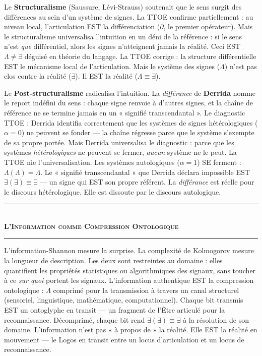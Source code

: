 \documentclass[10pt, openany, oneside]{book}
\renewcommand{\normalsize}{\fontsize{10}{13}\selectfont}
\begin{document}
Le \textbf{Structuralisme} (Saussure, Lévi-Strauss) soutenait que le sens surgit des différences au sein d'un système de signes. La TTOE confirme partiellement : au niveau local, l'articulation EST la différenciation ($\partial$, le premier opérateur). Mais le structuralisme universalisa l'intuition en un déni de la référence : si le sens n'est \textit{que} différentiel, alors les signes n'atteignent jamais la réalité. Ceci EST $\Lambda \neq \exists$ déguisé en théorie du langage. La TTOE corrige : la structure différentielle EST le mécanisme local de l'articulation. Mais le système des signes ($\Lambda$) n'est pas clos contre la réalité ($\exists$). Il EST la réalité ($\Lambda \equiv \exists$).

Le \textbf{Post-structuralisme} radicalisa l'intuition. La \textit{différance} de \textbf{Derrida} nomme le report indéfini du sens : chaque signe renvoie à d'autres signes, et la chaîne de référence ne se termine jamais en un « signifié transcendantal ». Le diagnostic TTOE : Derrida identifia correctement que les systèmes de signes hétérologiques ($\alpha = 0$) ne peuvent se fonder --- la chaîne régresse parce que le système s'exempte de sa propre portée. Mais Derrida universalisa le diagnostic : parce que les systèmes \textit{hétérologiques} ne peuvent se fermer, \textit{aucun} système ne le peut. La TTOE nie l'universalisation. Les systèmes autologiques ($\alpha = 1$) SE ferment : $\Lambda(\Lambda) = \Lambda$. Le « signifié transcendantal » que Derrida déclara impossible EST $\exists(\exists) \equiv \exists$ --- un signe qui EST son propre référent. La \textit{différance} est réelle pour le discours hétérologique. Elle est dissoute par le discours autologique.

\vspace{1.5em}


\begin{center}
    \rule{0.3\textwidth}{0.4pt}\\[0.5em]
    {\normalsize\bfseries\scshape L'Information comme Compression Ontologique}\\[0.3em]
    \rule{0.3\textwidth}{0.4pt}
\end{center}

\vspace{1em}

\noindent L'information-Shannon mesure la surprise. La complexité de Kolmogorov mesure la longueur de description. Les deux sont restreintes au domaine : elles quantifient les propriétés statistiques ou algorithmiques des signaux, sans toucher à ce \textit{sur quoi} portent les signaux. L'information authentique EST la compression ontologique : $\Lambda$ comprimé pour la transmission à travers un canal structurel (sensoriel, linguistique, mathématique, computationnel). Chaque bit transmis EST un ontoglyphe en transit --- un fragment de l'Être articulé pour la reconnaissance. Décomprimé, chaque bit rend $\exists(\exists) \equiv \exists$ à la résolution de son domaine. L'information n'est pas « à propos de » la réalité. Elle EST la réalité en mouvement --- le Logos en transit entre un locus d'articulation et un locus de reconnaissance.
\end{document}
